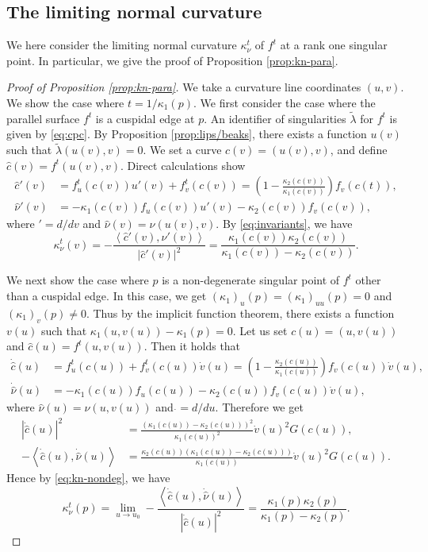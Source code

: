 \documentclass[11pt,a4paper,pdflatex,final]{amsart}
\theoremstyle{plain}
\theoremstyle{definition}
\theoremstyle{remark}
\newcommand{\0}{\bm{0}}
\newcommand{\til}{\tilde}
\newcommand{\inner}[2]{\left\langle{#1},{#2}\right\rangle}
\numberwithin{equation}{section}
\begin{document}
\subsection{The limiting normal curvature}
{
We here consider the limiting normal curvature $\kappa_\nu^t$ of $f^t$ 
at a rank one singular point.
In particular, we give the proof of Proposition \ref{prop:kn-para}. 
}
\begin{proof}[Proof of Proposition \ref{prop:kn-para}]
We take a curvature line coordinates $(u,v)$. 
{We show the case where $t=1/\kappa_1(p)$.} 
We first consider the case where the parallel surface $f^t$ is a cuspidal edge at $p$. 
An identifier of singularities $\til{\lambda}$ for $f^t$ 
is given by \eqref{eq:cpc}. 
By Proposition \ref{prop:lips/beaks}, 
there exists a function $u(v)$ such that 
$\til\lambda(u(v),v)=0$. 
We set a curve $c(v)=(u(v),v)$, and 
define $\hat{c}(v)=f^t(u(v),v)$. 
Direct calculations show 
\begin{equation}\label{eq:diff-c}
	\begin{aligned}
		\hat{c}'(v)&=f^t_u(c(v))u'(v)+f^t_v(c(v))
		=\left(1-\frac{\kappa_2(c(v))}{\kappa_1(c(v))}\right)f_v(c(t)),\\
		\hat{\nu}'(v)&=-\kappa_1(c(v))f_u(c(v))u'(v)-\kappa_2(c(v))f_v(c(v)),
	\end{aligned}
\end{equation}
where $'=d/dv$ and $\hat{\nu}(v)=\nu(u(v),v)$. 
{By \eqref{eq:invariants},} we have 
\[
\kappa_\nu^{t}(v)=-\frac{\inner{\hat{c}'(v)}{\hat{\nu}'(v)}}{|\hat{c}'(v)|^2}
=\frac{\kappa_1(c(v))\kappa_2(c(v))}{\kappa_1(c(v))-\kappa_2(c(v))}.
\]	

We next show the case where $p$ is a non-degenerate singular point of $f^t$ 
other than a cuspidal edge. 
In this case, we get $(\kappa_1)_u(p)=(\kappa_1)_{uu}(p)=0$ 
and $(\kappa_1)_{v}(p)\neq0$. 
Thus by the implicit function theorem, 
there exists a function $v(u)$ such that $\kappa_1(u,v(u))-\kappa_1(p)=0$. 
Let us set $c(u)=(u,v(u))$ and $\hat{c}(u)=f^t(u,v(u))$. 
Then it holds that 
\[
\begin{aligned}
	\dot{\hat{c}}(u)&=f^t_u(c(u))+f^t_{v}(c(u))\dot{v}(u)
	=\left(1-\frac{\kappa_2(c(u))}{\kappa_1(c(u))}\right)f_v(c(u))\dot{v}(u),\\
	\dot{\hat{\nu}}(u)&=
	-\kappa_1(c(u))f_u(c(u))-\kappa_2(c(u))f_v(c(u))\dot{v}(u),
\end{aligned}
\]
where $\hat{\nu}(u)=\nu(u,v(u))$ and $\dot{}=d/du$. 
Therefore we get 
\[
\begin{aligned}
	|\dot{\hat{c}}(u)|^2
	&=\frac{(\kappa_1(c(u))-\kappa_2(c(u)))^2}{\kappa_1(c(u))^2}\dot{v}(u)^2G(c(u)),\\
	-\inner{\dot{\hat{c}}(u)}{\dot{\hat{\nu}}(u)}
	&=\frac{\kappa_2(c(u))(\kappa_1(c(u))-\kappa_2(c(u)))}{\kappa_1(c(u))}\dot{v}(u)^2G(c(u)).
\end{aligned}
\]
Hence {by \eqref{eq:kn-nondeg},} we have 
\[
\kappa_\nu^t(p)
=\lim_{u\to u_0}-\frac{\inner{\dot{\hat{c}}(u)}{\dot{\hat{\nu}}(u)}}{|\dot{\hat{c}}(u)|^2}
=\frac{\kappa_1(p)\kappa_2(p)}{\kappa_1(p)-\kappa_2(p)}.
\]


\end{proof}
\end{document}

